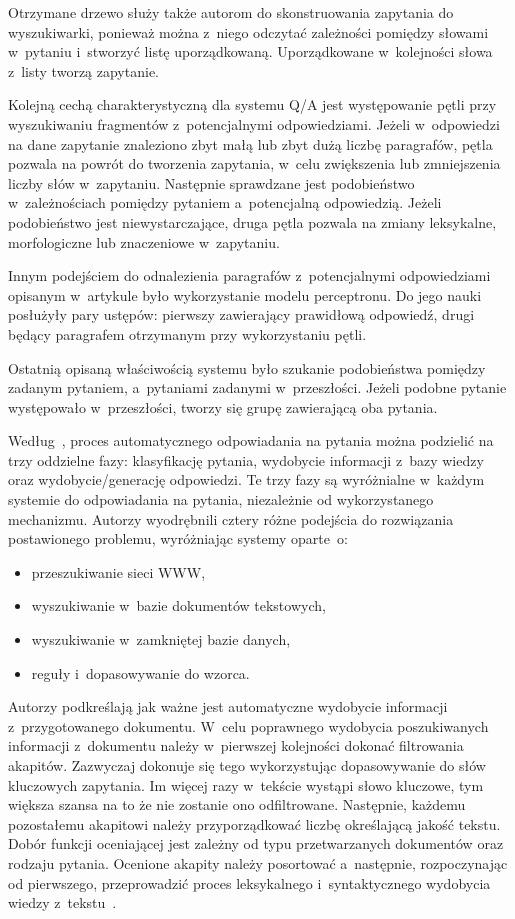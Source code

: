 Otrzymane drzewo służy także autorom do skonstruowania zapytania do wyszukiwarki, ponieważ można z~niego odczytać zależności pomiędzy słowami w~pytaniu i~stworzyć listę uporządkowaną. Uporządkowane w~kolejności słowa z~listy tworzą zapytanie. 

Kolejną cechą charakterystyczną dla systemu Q/A jest występowanie pętli przy wyszukiwaniu fragmentów z~potencjalnymi odpowiedziami. Jeżeli w~odpowiedzi na dane zapytanie znaleziono zbyt małą lub zbyt dużą liczbę paragrafów, pętla pozwala na powrót do tworzenia zapytania, w~celu zwiększenia lub zmniejszenia liczby słów w~zapytaniu. Następnie sprawdzane jest podobieństwo w~zależnościach pomiędzy pytaniem a~potencjalną odpowiedzią. Jeżeli podobieństwo jest niewystarczające, druga pętla pozwala na zmiany leksykalne, morfologiczne lub znaczeniowe w~zapytaniu. 

Innym podejściem do odnalezienia paragrafów z~potencjalnymi odpowiedziami opisanym w~artykule było wykorzystanie modelu perceptronu. Do jego nauki posłużyły pary ustępów: pierwszy zawierający prawidłową odpowiedź, drugi będący paragrafem otrzymanym przy wykorzystaniu pętli.

Ostatnią opisaną właściwością systemu było szukanie podobieństwa pomiędzy zadanym pytaniem, a~pytaniami zadanymi w~przeszłości. Jeżeli podobne pytanie występowało w~przeszłości, tworzy się grupę zawierającą oba pytania\cite{hpqa}.

Według~\cite{gupta2012survey}, proces automatycznego odpowiadania na pytania można podzielić na trzy oddzielne fazy: klasyfikację pytania, wydobycie informacji z~bazy wiedzy oraz wydobycie/generację odpowiedzi. Te trzy fazy są wyróżnialne w~każdym systemie do odpowiadania na pytania, niezależnie od wykorzystanego mechanizmu. Autorzy wyodrębnili cztery różne podejścia do rozwiązania postawionego problemu, wyróżniając systemy oparte~o:
\begin{itemize}
	\item przeszukiwanie sieci WWW,
	\item wyszukiwanie w~bazie dokumentów tekstowych,
	\item wyszukiwanie w~zamkniętej bazie danych,
	\item reguły i~dopasowywanie do wzorca.
\end{itemize}

Autorzy podkreślają jak ważne jest automatyczne wydobycie informacji z~przygotowanego dokumentu. W~celu poprawnego wydobycia poszukiwanych informacji z~dokumentu należy w~pierwszej kolejności dokonać filtrowania akapitów. Zazwyczaj dokonuje się tego wykorzystując dopasowywanie do słów kluczowych zapytania. Im więcej razy w~tekście wystąpi słowo kluczowe, tym większa szansa na to że nie zostanie ono odfiltrowane. Następnie, każdemu pozostałemu akapitowi należy przyporządkować liczbę określającą jakość tekstu.
Dobór funkcji oceniającej jest zależny od typu przetwarzanych dokumentów oraz rodzaju pytania. Ocenione akapity należy posortować a~następnie, rozpoczynając od pierwszego, przeprowadzić proces leksykalnego i~syntaktycznego wydobycia wiedzy z~tekstu~\cite{gupta2012survey}.

